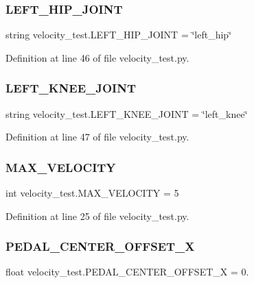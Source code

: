 \subsubsection{\texorpdfstring{LEFT\_HIP\_JOINT}{LEFT\_HIP\_JOINT}}
{\footnotesize\ttfamily string velocity\+\_\+test.\+L\+E\+F\+T\+\_\+\+H\+I\+P\+\_\+\+J\+O\+I\+NT = \char`\"{}left\+\_\+hip\char`\"{}}



Definition at line 46 of file velocity\+\_\+test.\+py.

\mbox{\label{namespacevelocity__test_a456e70c0db66db9da24b1af04763749d}} 
\subsubsection{\texorpdfstring{LEFT\_KNEE\_JOINT}{LEFT\_KNEE\_JOINT}}
{\footnotesize\ttfamily string velocity\+\_\+test.\+L\+E\+F\+T\+\_\+\+K\+N\+E\+E\+\_\+\+J\+O\+I\+NT = \char`\"{}left\+\_\+knee\char`\"{}}



Definition at line 47 of file velocity\+\_\+test.\+py.

\mbox{\label{namespacevelocity__test_ad1792a9ca3ac37179a663d41f326e218}} 
\subsubsection{\texorpdfstring{MAX\_VELOCITY}{MAX\_VELOCITY}}
{\footnotesize\ttfamily int velocity\+\_\+test.\+M\+A\+X\+\_\+\+V\+E\+L\+O\+C\+I\+TY = 5}



Definition at line 25 of file velocity\+\_\+test.\+py.

\mbox{\label{namespacevelocity__test_ac597badfac305e8b24a84979e5931501}} 
\subsubsection{\texorpdfstring{PEDAL\_CENTER\_OFFSET\_X}{PEDAL\_CENTER\_OFFSET\_X}}
{\footnotesize\ttfamily float velocity\+\_\+test.\+P\+E\+D\+A\+L\+\_\+\+C\+E\+N\+T\+E\+R\+\_\+\+O\+F\+F\+S\+E\+T\+\_\+X = 0.}



